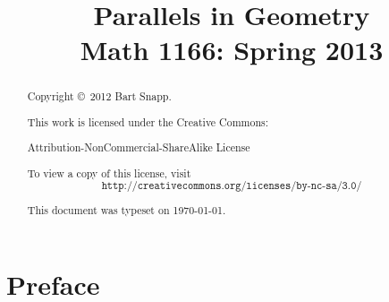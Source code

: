 

\title{
\textbf{\textsf{
\Huge Parallels in Geometry \\
\Large Math 1166: Spring 2013
}}}
\author{}
\date{}
\maketitle



\begin{abstract}
Copyright \copyright~2012 Bart Snapp.

\vspace{.5cm}

\noindent
This work is licensed under the Creative Commons:
\begin{center}
Attribution-NonCommercial-ShareAlike License 
\end{center}
To view a copy of this license, visit
\[
\texttt{http://creativecommons.org/licenses/by-nc-sa/3.0/}
\]

\vspace{.5cm}

\noindent This document was typeset on \today.

\end{abstract}



\chapter*{Preface}


